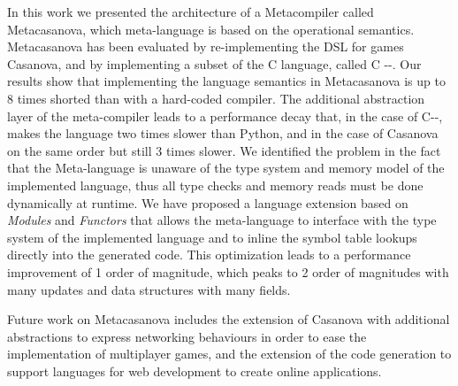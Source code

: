 In this work we presented the architecture of a Metacompiler called Metacasanova, which meta-language is based on the operational semantics. Metacasanova has been evaluated by re-implementing the DSL for games Casanova, and by implementing a subset of the C language, called C -{}-. Our results show that implementing the language semantics in Metacasanova is up to 8 times shorted than with a hard-coded compiler. The additional abstraction layer of the meta-compiler leads to a performance decay that, in the case of C-{}-, makes the language two times slower than Python, and in the case of Casanova on the same order but still 3 times slower. We identified the problem in the fact that the Meta-language is unaware of the type system and memory model of the implemented language, thus all type checks and memory reads must be done dynamically at runtime. We have proposed a language extension based on \textit{Modules} and \textit{Functors} that allows the meta-language to interface with the type system of the implemented language and to inline the symbol table lookups directly into the generated code. This optimization leads to a performance improvement of 1 order of magnitude, which peaks to 2 order of magnitudes with many updates and data structures with many fields. 

Future work on Metacasanova includes the extension of Casanova with additional abstractions to express networking behaviours in order to ease the implementation of multiplayer games, and the extension of the code generation to support languages for web development to create online applications.